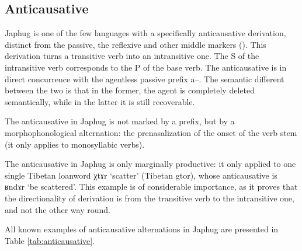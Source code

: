 \documentclass[oldfontcommands,oneside,a4paper,11pt]{article}
\newcommand{\ipa}[1]{{\phon \mbox{#1}}} %
\begin{document}
\subsection{Anticausative}
Japhug is one of the few languages with a specifically anticausative derivation, distinct from the passive, the reflexive and other middle markers (\citealt{jacques12demotion}). This derivation turns a transitive verb into an intransitive one. The S of the intransitive verb corresponds to the P of the base verb. The anticausative is in direct concurrence with the agentless passive prefix \ipa{a--}. The semantic different between the two is that in the former, the agent is completely deleted semantically, while in the latter it is still recoverable.

The anticausative in Japhug is not marked by a prefix, but by a morphophonological alternation: the prenasalization of the onset of the verb stem (it only applies to monosyllabic verbs).
 
The anticausative in Japhug is only marginally productive: it only applied to one single Tibetan loanword \ipa{χtɤr} `scatter' (Tibetan \ipa{gtor}), whose anticausative is \ipa{ʁndɤr} `be scattered'. This example is of considerable importance, as it proves that the directionality of derivation is from the transitive verb to the intransitive one, and not the other way round. 

All known examples of anticausative alternations  in Japhug are presented in Table \ref{tab:anticausative}.
 
\end{document}

